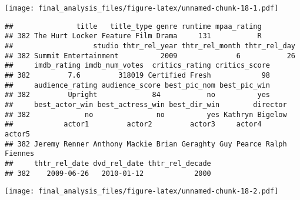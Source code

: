 \documentclass[]{article}
\newenvironment{Shaded}{\begin{snugshade}}{\end{snugshade}}
\newcommand{\DataTypeTok}[1]{\textcolor[rgb]{0.13,0.29,0.53}{#1}}
\newcommand{\KeywordTok}[1]{\textcolor[rgb]{0.13,0.29,0.53}{\textbf{#1}}}
\newcommand{\NormalTok}[1]{#1}
\newcommand{\OperatorTok}[1]{\textcolor[rgb]{0.81,0.36,0.00}{\textbf{#1}}}
\newcommand{\StringTok}[1]{\textcolor[rgb]{0.31,0.60,0.02}{#1}}
\begin{document}
\texttt{[image: final\_analysis\_files/figure-latex/unnamed-chunk-18-1.pdf]}

\begin{Shaded}
\end{Shaded}

\begin{verbatim}
##               title   title_type genre runtime mpaa_rating
## 382 The Hurt Locker Feature Film Drama     131           R
##                   studio thtr_rel_year thtr_rel_month thtr_rel_day
## 382 Summit Entertainment          2009              6           26
##     imdb_rating imdb_num_votes  critics_rating critics_score
## 382         7.6         318019 Certified Fresh            98
##     audience_rating audience_score best_pic_nom best_pic_win
## 382         Upright             84           no          yes
##     best_actor_win best_actress_win best_dir_win        director
## 382             no               no          yes Kathryn Bigelow
##            actor1         actor2         actor3     actor4        actor5
## 382 Jeremy Renner Anthony Mackie Brian Geraghty Guy Pearce Ralph Fiennes
##     thtr_rel_date dvd_rel_date thtr_rel_decade
## 382    2009-06-26   2010-01-12            2000
\end{verbatim}

\begin{Shaded}
\end{Shaded}

\texttt{[image: final\_analysis\_files/figure-latex/unnamed-chunk-18-2.pdf]}
\end{document}
